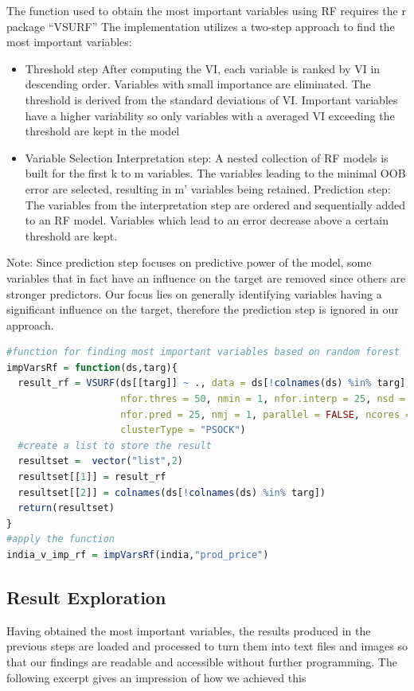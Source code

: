 \documentclass[11pt]{article}
\begin{document}
The function used to obtain the most important variables using RF requires the r package “VSURF” 
The implementation utilizes a two-step approach to find the most important variables:
\begin{itemize}
\item Threshold step
After computing the VI, each variable is ranked by VI in descending order.
Variables with small importance are eliminated. The threshold is derived from the standard deviations of VI. Important variables have a higher variability so only variables with a averaged VI exceeding the threshold are kept in the model
\item Variable Selection
Interpretation step: 
A nested collection of RF models is built for the first k to m variables. The variables leading to the minimal OOB error are selected, resulting in m’ variables being retained.
Prediction step:
The variables from the interpretation step are ordered and sequentially added to an RF model. Variables which lead to an error decrease above a certain threshold are kept.
\end{itemize}
Note: Since prediction step focuses on predictive power of the model, some variables that in fact have an influence on the target are removed since others are stronger predictors. Our focus lies on generally identifying variables having a significant influence on the target, therefore the prediction step is ignored in our approach.

\begin{lstlisting}[language= R, captionpos=b,caption=\href{https://github.com/jaidikam/sps_ws1718/tree/master/Qfolder5}{SPL\_Q5\_india\_impvar\_rf}]
#function for finding most important variables based on random forest  
impVarsRf = function(ds,targ){
  result_rf = VSURF(ds[[targ]] ~ ., data = ds[!colnames(ds) %in% targ], ntree = 2000,
                    nfor.thres = 50, nmin = 1, nfor.interp = 25, nsd = 1,
                    nfor.pred = 25, nmj = 1, parallel = FALSE, ncores = detectCores() - 1,
                    clusterType = "PSOCK")
  #create a list to store the result
  resultset =  vector("list",2)  
  resultset[[1]] = result_rf
  resultset[[2]] = colnames(ds[!colnames(ds) %in% targ])
  return(resultset)
}
#apply the function
india_v_imp_rf = impVarsRf(india,"prod_price")
\end{lstlisting}

\subsection{Result Exploration}
Having obtained the most important variables, the results produced in the previous steps are loaded and processed to turn them into text files and images so that our findings are readable and accessible without further programming.
The following excerpt gives an impression of how we achieved this
\end{document}
